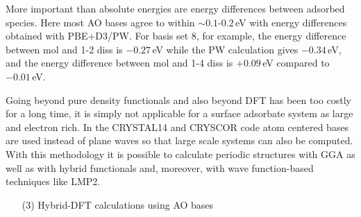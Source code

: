 \documentclass[11pt,DIV=13,BCOR=5mm,a4paper,headinclude]{scrbook}
\begin{document}
More important than absolute energies are energy differences between adsorbed species.
Here most AO bases agree to within $\sim 0.1$-$0.2\,$eV with energy differences obtained with PBE+D3/PW.
For basis set 8, for example, the energy difference between mol and 1-2 diss is $-0.27\,$eV while the PW calculation gives $-0.34\,$eV, and the energy difference between mol and 1-4 diss is $+0.09\,$eV compared to $-0.01\,$eV.

Going beyond pure density functionals and also beyond DFT has been too costly for a long time, it is simply not applicable for a surface adsorbate system as large and electron rich.
In the CRYSTAL14\cite{crystal14} and CRYSCOR\cite{cryscor} code atom centered bases are used instead of plane waves so that large scale systems can also be computed.
With this methodology it is possible to calculate periodic structures with GGA as well as with hybrid functionals and, moreover, with wave function-based techniques like LMP2.
\begin{enumerate}
 \item[(3)] Hybrid-DFT calculations using AO bases
\end{enumerate}
\end{document}
